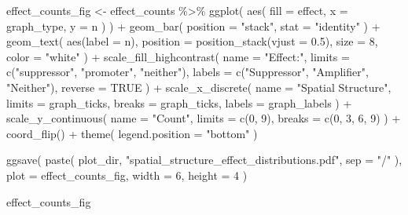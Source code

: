\documentclass[
]{book}
\newenvironment{Shaded}{\begin{snugshade}}{\end{snugshade}}
\newcommand{\AttributeTok}[1]{\textcolor[rgb]{0.77,0.63,0.00}{#1}}
\newcommand{\ConstantTok}[1]{\textcolor[rgb]{0.00,0.00,0.00}{#1}}
\newcommand{\DecValTok}[1]{\textcolor[rgb]{0.00,0.00,0.81}{#1}}
\newcommand{\FloatTok}[1]{\textcolor[rgb]{0.00,0.00,0.81}{#1}}
\newcommand{\FunctionTok}[1]{\textcolor[rgb]{0.00,0.00,0.00}{#1}}
\newcommand{\NormalTok}[1]{#1}
\newcommand{\OtherTok}[1]{\textcolor[rgb]{0.56,0.35,0.01}{#1}}
\newcommand{\SpecialCharTok}[1]{\textcolor[rgb]{0.00,0.00,0.00}{#1}}
\newcommand{\StringTok}[1]{\textcolor[rgb]{0.31,0.60,0.02}{#1}}
\begin{document}
\begin{Shaded}
\begin{Highlighting}[]
\NormalTok{effect\_counts\_fig }\OtherTok{\textless{}{-}}\NormalTok{ effect\_counts }\SpecialCharTok{\%\textgreater{}\%}
  \FunctionTok{ggplot}\NormalTok{(}
    \FunctionTok{aes}\NormalTok{(}
      \AttributeTok{fill =}\NormalTok{ effect,}
      \AttributeTok{x =}\NormalTok{ graph\_type,}
      \AttributeTok{y =}\NormalTok{ n}
\NormalTok{    )}
\NormalTok{  ) }\SpecialCharTok{+}
  \FunctionTok{geom\_bar}\NormalTok{(}
    \AttributeTok{position =} \StringTok{"stack"}\NormalTok{,}
    \AttributeTok{stat =} \StringTok{"identity"}
\NormalTok{  ) }\SpecialCharTok{+}
  \FunctionTok{geom\_text}\NormalTok{(}
    \FunctionTok{aes}\NormalTok{(}\AttributeTok{label =}\NormalTok{ n),}
    \AttributeTok{position =} \FunctionTok{position\_stack}\NormalTok{(}\AttributeTok{vjust =} \FloatTok{0.5}\NormalTok{),}
    \AttributeTok{size =} \DecValTok{8}\NormalTok{,}
    \AttributeTok{color =} \StringTok{"white"}
\NormalTok{  ) }\SpecialCharTok{+}
  \FunctionTok{scale\_fill\_highcontrast}\NormalTok{(}
    \AttributeTok{name =} \StringTok{"Effect:"}\NormalTok{,}
    \AttributeTok{limits =} \FunctionTok{c}\NormalTok{(}\StringTok{"suppressor"}\NormalTok{, }\StringTok{"promoter"}\NormalTok{, }\StringTok{"neither"}\NormalTok{),}
    \AttributeTok{labels =} \FunctionTok{c}\NormalTok{(}\StringTok{"Suppressor"}\NormalTok{, }\StringTok{"Amplifier"}\NormalTok{, }\StringTok{"Neither"}\NormalTok{),}
    \AttributeTok{reverse =} \ConstantTok{TRUE}
\NormalTok{  ) }\SpecialCharTok{+}
  \FunctionTok{scale\_x\_discrete}\NormalTok{(}
    \AttributeTok{name =} \StringTok{"Spatial Structure"}\NormalTok{,}
    \AttributeTok{limits =}\NormalTok{ graph\_ticks,}
    \AttributeTok{breaks =}\NormalTok{ graph\_ticks,}
    \AttributeTok{labels =}\NormalTok{ graph\_labels}
\NormalTok{  ) }\SpecialCharTok{+}
  \FunctionTok{scale\_y\_continuous}\NormalTok{(}
    \AttributeTok{name =} \StringTok{"Count"}\NormalTok{,}
    \AttributeTok{limits =} \FunctionTok{c}\NormalTok{(}\DecValTok{0}\NormalTok{, }\DecValTok{9}\NormalTok{),}
    \AttributeTok{breaks =} \FunctionTok{c}\NormalTok{(}\DecValTok{0}\NormalTok{, }\DecValTok{3}\NormalTok{, }\DecValTok{6}\NormalTok{, }\DecValTok{9}\NormalTok{)}
\NormalTok{  ) }\SpecialCharTok{+}
  \FunctionTok{coord\_flip}\NormalTok{() }\SpecialCharTok{+}
  \FunctionTok{theme}\NormalTok{(}
    \AttributeTok{legend.position =} \StringTok{"bottom"}
\NormalTok{  )}

\FunctionTok{ggsave}\NormalTok{(}
  \FunctionTok{paste}\NormalTok{(}
\NormalTok{    plot\_dir,}
    \StringTok{"spatial\_structure\_effect\_distributions.pdf"}\NormalTok{,}
    \AttributeTok{sep =} \StringTok{"/"}
\NormalTok{  ),}
  \AttributeTok{plot =}\NormalTok{ effect\_counts\_fig,}
  \AttributeTok{width =} \DecValTok{6}\NormalTok{,}
  \AttributeTok{height =} \DecValTok{4}
\NormalTok{)}

\NormalTok{effect\_counts\_fig}
\end{Highlighting}
\end{Shaded}
\end{document}
